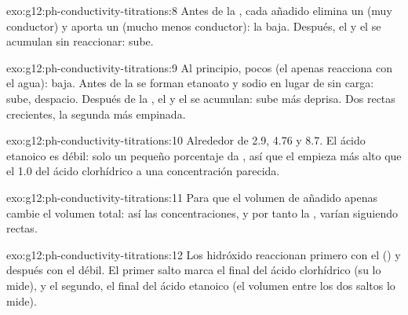 \begin{solution}{exo:g12:ph-conductivity-titrations:8}
Antes de la , cada  añadido elimina un  (muy
conductor) y aporta un  (mucho menos conductor): la 
baja. Después, el  y el  se acumulan sin reaccionar:
sube.
\end{solution}

\begin{solution}{exo:g12:ph-conductivity-titrations:9}
Al principio, pocos  (el  apenas reacciona con el agua):
 baja. Antes de la  se forman  etanoato y
sodio en lugar de  sin carga: sube, despacio. Después de la
, el  y el  se acumulan: sube más deprisa.
Dos rectas crecientes, la segunda más empinada.
\end{solution}

\begin{solution}{exo:g12:ph-conductivity-titrations:10}
Alrededor de 2.9, 4.76 y 8.7. El ácido etanoico es débil: solo un pequeño
porcentaje da , así que el  empieza más alto que el 1.0 del
ácido clorhídrico a una concentración parecida.
\end{solution}

\begin{solution}{exo:g12:ph-conductivity-titrations:11}
Para que el volumen de  añadido apenas cambie el volumen total:
así las concentraciones, y por tanto la , varían siguiendo
rectas.
\end{solution}

\begin{solution}{exo:g12:ph-conductivity-titrations:12}
Los  hidróxido reaccionan primero con el  () y
después con el débil. El primer salto marca el final del ácido
clorhídrico (su  lo mide), y el segundo, el final
del ácido etanoico (el volumen entre los dos saltos lo mide).
\end{solution}

